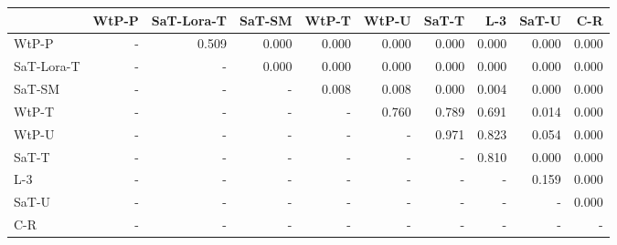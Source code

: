 \begin{tabular}{lrrrrrrrrr}
\toprule
 & WtP-P & SaT-Lora-T & SaT-SM & WtP-T & WtP-U & SaT-T & L-3 & SaT-U & C-R \\
\midrule
WtP-P & - & 0.509 & 0.000 & 0.000 & 0.000 & 0.000 & 0.000 & 0.000 & 0.000 \\
SaT-Lora-T & - & - & 0.000 & 0.000 & 0.000 & 0.000 & 0.000 & 0.000 & 0.000 \\
SaT-SM & - & - & - & 0.008 & 0.008 & 0.000 & 0.004 & 0.000 & 0.000 \\
WtP-T & - & - & - & - & 0.760 & 0.789 & 0.691 & 0.014 & 0.000 \\
WtP-U & - & - & - & - & - & 0.971 & 0.823 & 0.054 & 0.000 \\
SaT-T & - & - & - & - & - & - & 0.810 & 0.000 & 0.000 \\
L-3 & - & - & - & - & - & - & - & 0.159 & 0.000 \\
SaT-U & - & - & - & - & - & - & - & - & 0.000 \\
C-R & - & - & - & - & - & - & - & - & - \\
\bottomrule
\end{tabular}

